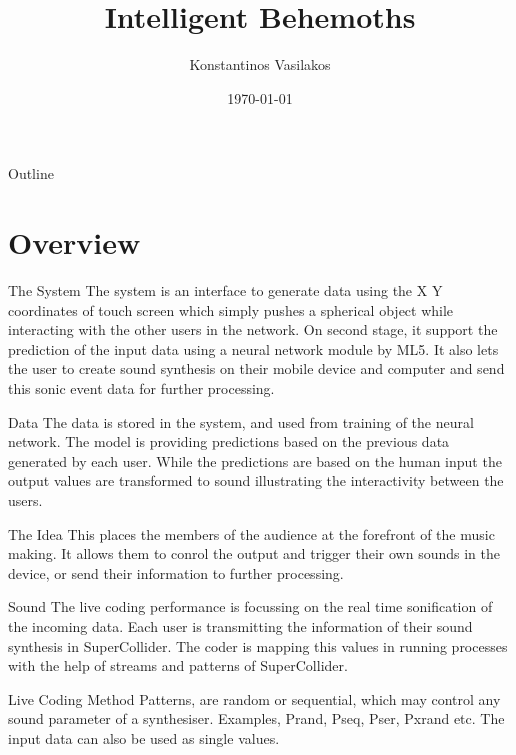 \documentclass[bigger]{beamer}
\author{Konstantinos Vasilakos}
\date{\today}
\title{Intelligent Behemoths}
\institute{konvas.netlify.app/}
\begin{document}
\maketitle
\begin{frame}{Outline}
\tableofcontents
\end{frame}

\section{Overview}
\label{sec:org9b6ad11}
\begin{frame}[label={sec:org9ee4110}]{The System}
The system is an interface to generate data using the X Y coordinates of touch screen which simply pushes a spherical object while interacting with the other users in the network. On second stage, it support the prediction of the input data using a neural network module by ML5. It also lets the user to create sound synthesis on their mobile device and computer and send this sonic event data for further processing.
\end{frame}
\begin{frame}[label={sec:orgb4c1f64}]{Data}
The data is stored in the system, and used from training of the neural network.
The model is providing predictions based on the previous data generated
by each user. While the predictions are based on the human input the output
values are transformed to sound illustrating the interactivity between the users.
\end{frame}
\begin{frame}[label={sec:org5ae3425}]{The Idea}
This places the members of the audience at the forefront of the music making.
It allows them to conrol the output and trigger their own sounds in the device,
or send their information to further processing.
\end{frame}
\begin{frame}[label={sec:orgfd61a8e}]{Sound}
The live coding performance is focussing on the real time sonification of the incoming data.
Each user is transmitting the information of their sound synthesis in SuperCollider.
The coder is mapping this values in running processes with the help of streams and patterns
of SuperCollider.
\end{frame}
\begin{frame}[label={sec:org24a08d4}]{Live Coding Method}
Patterns, are random or sequential, which may control any sound parameter of a synthesiser.
Examples, Prand, Pseq, Pser, Pxrand etc. The input data can also be used as single values.
\end{frame}
\end{document}
